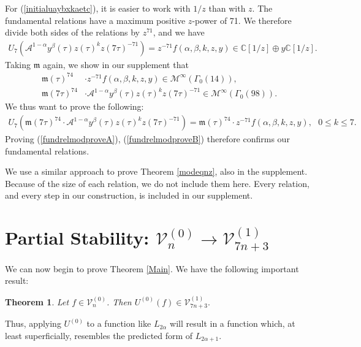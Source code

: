\documentclass[reqno]{amsart}
\newtheorem{theorem}{Theorem}[section]
\theoremstyle{definition}
\theoremstyle{remark}
\numberwithin{equation}{section}
\begin{document}
For (\ref{initialuaybxkaetc}), it is easier to work with $1/z$ than with $z$.  The fundamental relations have a maximum positive $z$-power of 71.  We therefore divide both sides of the relations by $z^{71}$, and we have
\begin{align*}
U_7\left(\mathcal{A}^{1-\alpha} y^{\beta}(\tau)z(\tau)^k z(7\tau)^{-71} \right)=z^{-71}f(\alpha,\beta,k,z,y)\in\mathbb{C}[1/z]\oplus y\mathbb{C}[1/z].
\end{align*}  Taking $\mathfrak{m}$ again, we show in our supplement that
\begin{align*}
\mathfrak{m}(\tau)^{74}&\cdot z^{-71}f(\alpha,\beta,k,z,y)\in\mathcal{M}^{\infty}\left( \Gamma_0(14) \right),\\
\mathfrak{m}(7\tau)^{74}&\cdot \mathcal{A}^{1-\alpha} y^{\beta}(\tau)z(\tau)^k z(7\tau)^{-71}\in\mathcal{M}^{\infty}\left( \Gamma_0(98) \right).
\end{align*}  We thus want to prove the following:
\begin{align}
U_7\left(\mathfrak{m}(7\tau)^{74}\cdot \mathcal{A}^{1-\alpha} y^{\beta}(\tau)z(\tau)^k z(7\tau)^{-71}\right) =\mathfrak{m}(\tau)^{74}\cdot z^{-71}f(\alpha,\beta,k,z,y),\text{ }0\le k\le 7.\label{fundrelmodproveB}
\end{align}  Proving (\ref{fundrelmodproveA}), (\ref{fundrelmodproveB}) therefore confirms our fundamental relations.

We use a similar approach to prove Theorem \ref{modeqnz}, also in the supplement.  Because of the size of each relation, we do not include them here.  Every relation, and every step in our construction, is included in our supplement.

\section{Partial Stability: $\mathcal{V}^{(0)}_n\rightarrow\mathcal{V}^{(1)}_{7n+3}$}\label{section0to1full}

We can now begin to prove Theorem \ref{Main}.  We have the following important result:

\begin{theorem}\label{goingv0tov1}
Let $f\in\mathcal{V}^{(0)}_n$.  Then $U^{(0)}(f)\in\mathcal{V}^{(1)}_{7n+3}.$
\end{theorem}

Thus, applying $U^{(0)}$ to a function like $L_{2\alpha}$ will result in a function which, at least superficially, resembles the predicted form of $L_{2\alpha+1}$.
\end{document}
